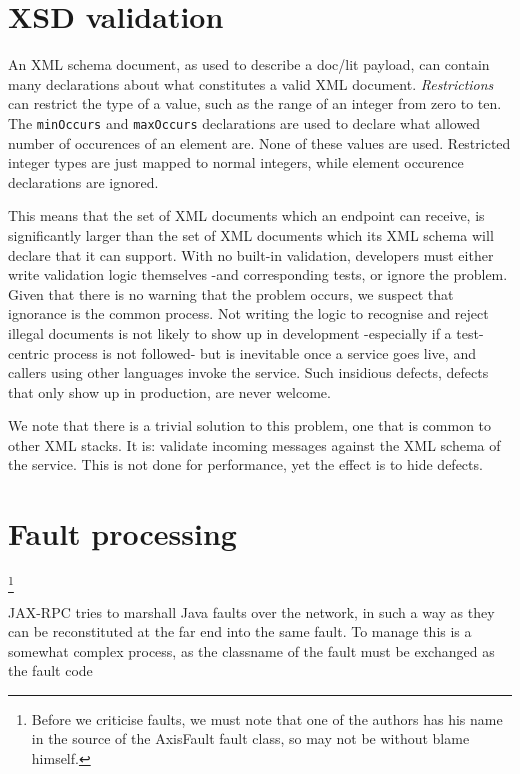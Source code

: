 \documentclass[draft]{article}
\begin{document}

\section{XSD validation}

An XML schema document, as used to describe a doc/lit payload, can contain many
declarations about what constitutes a valid XML document. \emph{Restrictions}
can restrict the type of a value, such as the range of an integer from zero to
ten. The \verb|minOccurs| and \verb|maxOccurs| declarations are used to declare
what allowed number of occurences of an element are. None of these values are
used. Restricted integer types are just mapped to normal integers, while element
occurence declarations are ignored. 

This means that the set of XML documents which an endpoint can receive, is
significantly larger than the set of XML documents which its XML schema will
declare that it can support. With no built-in validation, developers must either
write validation logic themselves -and corresponding tests, or ignore the
problem. Given that there is no warning that the problem occurs, we suspect that
ignorance is the common process. Not writing the logic to recognise and reject
illegal documents is not likely to show up in development -especially if a
test-centric process is not followed- but is inevitable once a service goes live,
and callers using other languages invoke the service. Such insidious defects,
defects that only show up in production, are never welcome. 

We note that there is a trivial solution to this problem, one that is common to
other XML stacks. It is: validate incoming messages against the XML schema of
the service. This is not done for performance, yet the effect is to hide
defects.  



\section{Fault processing}

\footnote{Before we criticise faults, we must note that one of the authors has his name
in the source of the AxisFault fault class, so may not be without blame
himself.}

JAX-RPC tries to marshall Java faults over the network, in such a way as they
can be reconstituted at the far end into the same fault. To manage this is a
somewhat complex process, as the classname of the fault must be exchanged as the
fault code
\end{document}
